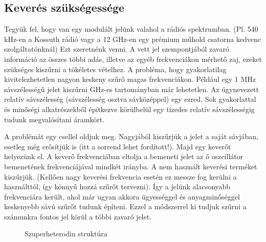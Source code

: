 \documentclass[12pt,a4paper]{article}
\begin{document}
\subsection{Keverés szükségessége}
Tegyük fel, hogy van egy modulált jelünk valahol a rádiós spektrumban. (Pl. 540 kHz-en a Kossuth rádió vagy a 12 GHz-en egy prémium műhold csatorna kedvenc szolgáltatónknál) Ezt szeretnénk venni. A vett jel szempontjából zavaró információ az összes többi adás, illetve az egyéb frekvenciákon mérhető zaj, ezeket szükséges kiszűrni a tökéletes vételhez. A probléma, hogy gyakorlatilag kivitelezhetetlen nagyon keskeny szűrő magas frekvenciákon. Például egy 1 MHz sávszélességű jelet kiszűrni GHz-es tartományban már lehetetlen. Az úgynevezett relatív sávszélesség (sávszélesség osztva sávközéppel) egy ezred. Sok gyakorlattal és minőségi alkatrészekből építkezve körülbelül egy tizedes relatív sávszélességig tudunk megvalósítani áramkört.\par
A problémát egy csellel oldjuk meg. Nagyjából kiszűrjük a jelet a saját sávjában, esetleg még erősítjük is (itt a sorrend lehet fordított!). Majd egy keverőt helyezünk el. A keverő frekvenciában eltolja a bemeneti jelet az ő oszcillátor bemenetének frekvenciájával mindkét irányba. A nem használt keverési terméket kiszűrjük. (Kellően nagy keverési frekvencia esetén ez messze fog kerülni a használttól, így könnyű hozzá szűrőt tervezni). Így a jelünk alacsonyabb frekvenciára került, ahol már ugyan akkora ügyességgel és anyagminőséggel keskenyebb sávú szűrőt tudunk építeni. Ezzel a módszerrel ki tudjuk szűrni a számunkra fontos jel körül a többi zavaró jelet.


\begin{figure}[H]
\label{fig:keverok}
\centering
{}
\caption{
Szuperheterodin struktúra} 
\end{figure}
\end{document}
